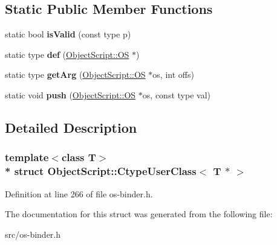 \subsection*{Static Public Member Functions}
\begin{DoxyCompactItemize}
\item 
static bool {\bfseries is\+Valid} (const type p)\hypertarget{struct_object_script_1_1_ctype_user_class_3_01_t_01_5_01_4_ac5eef2ab914b195701e3ea562339897f}{}\label{struct_object_script_1_1_ctype_user_class_3_01_t_01_5_01_4_ac5eef2ab914b195701e3ea562339897f}

\item 
static type {\bfseries def} (\hyperlink{class_object_script_1_1_o_s}{Object\+Script\+::\+OS} $\ast$)\hypertarget{struct_object_script_1_1_ctype_user_class_3_01_t_01_5_01_4_a9de1d5a31e7a46eb4a6f3c1772a66426}{}\label{struct_object_script_1_1_ctype_user_class_3_01_t_01_5_01_4_a9de1d5a31e7a46eb4a6f3c1772a66426}

\item 
static type {\bfseries get\+Arg} (\hyperlink{class_object_script_1_1_o_s}{Object\+Script\+::\+OS} $\ast$os, int offs)\hypertarget{struct_object_script_1_1_ctype_user_class_3_01_t_01_5_01_4_ab0fd973d1d4339cf55011d21dc133441}{}\label{struct_object_script_1_1_ctype_user_class_3_01_t_01_5_01_4_ab0fd973d1d4339cf55011d21dc133441}

\item 
static void {\bfseries push} (\hyperlink{class_object_script_1_1_o_s}{Object\+Script\+::\+OS} $\ast$os, const type val)\hypertarget{struct_object_script_1_1_ctype_user_class_3_01_t_01_5_01_4_a94fd571aae25d266a680fcbfa2ca402b}{}\label{struct_object_script_1_1_ctype_user_class_3_01_t_01_5_01_4_a94fd571aae25d266a680fcbfa2ca402b}

\end{DoxyCompactItemize}


\subsection{Detailed Description}
\subsubsection*{template$<$class T$>$\\*
struct Object\+Script\+::\+Ctype\+User\+Class$<$ T $\ast$ $>$}



Definition at line 266 of file os-\/binder.\+h.



The documentation for this struct was generated from the following file\+:\begin{DoxyCompactItemize}
\item 
src/os-\/binder.\+h\end{DoxyCompactItemize}
